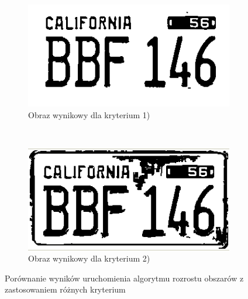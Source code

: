 \begin{figure}
  \centering
  \begin{subfigure}[b]{0.45\textwidth}
    \includegraphics[width=\textwidth]{img/region-growing-relative}
    \caption{Obraz wynikowy dla kryterium 1)}
    \label{fig:region_growing_relative}
  \end{subfigure}
  ~
  \begin{subfigure}[b]{0.45\textwidth}
    \includegraphics[width=\textwidth]{img/region-growing-absolute}
    \caption{Obraz wynikowy dla kryterium 2)}
    \label{fig:region_growing_absolute}
  \end{subfigure}
  \caption{Porównanie wyników uruchomienia algorytmu rozrostu obszarów z zastosowaniem różnych kryterium}
    \label{fig:region_growing}
\end{figure}


